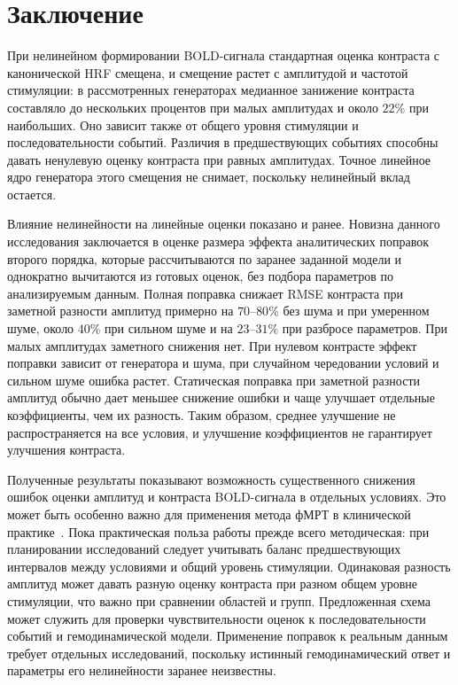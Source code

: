 

\section*{Заключение}

При нелинейном формировании BOLD-сигнала стандартная оценка контраста с канонической HRF смещена, и смещение растет с амплитудой и частотой стимуляции: в рассмотренных генераторах медианное занижение контраста составляло до нескольких процентов при малых амплитудах и около $22\%$ при наибольших. Оно зависит также от общего уровня стимуляции и последовательности событий. Различия в предшествующих событиях способны давать ненулевую оценку контраста при равных амплитудах. Точное линейное ядро генератора этого смещения не снимает, поскольку нелинейный вклад остается.

Влияние нелинейности на линейные оценки показано и ранее. Новизна данного исследования заключается в оценке размера эффекта аналитических поправок второго порядка, которые рассчитываются по заранее заданной модели и однократно вычитаются из готовых оценок, без подбора параметров по анализируемым данным. Полная поправка снижает RMSE контраста при заметной разности амплитуд примерно на $70$--$80\%$ без шума и при умеренном шуме, около $40\%$ при сильном шуме и на $23$--$31\%$ при разбросе параметров. При малых амплитудах заметного снижения нет. При нулевом контрасте эффект поправки зависит от генератора и шума, при случайном чередовании условий и сильном шуме ошибка растет. Статическая поправка при заметной разности амплитуд обычно дает меньшее снижение ошибки и чаще улучшает отдельные коэффициенты, чем их разность. Таким образом, среднее улучшение не распространяется на все условия, и улучшение коэффициентов не гарантирует улучшения контраста.

Полученные результаты показывают возможность существенного снижения ошибок оценки амплитуд и контраста BOLD-сигнала в отдельных условиях. Это может быть особенно важно для применения метода фМРТ в клинической практике~\cite{medvedev2012,kireev2013,myznikov2026}.
Пока практическая польза работы прежде всего методическая: при планировании исследований следует учитывать баланс предшествующих интервалов между условиями и общий уровень стимуляции. Одинаковая разность амплитуд может давать разную оценку контраста при разном общем уровне стимуляции, что важно при сравнении областей и групп. Предложенная схема может служить для проверки чувствительности оценок к последовательности событий и гемодинамической модели. Применение поправок к реальным данным требует отдельных исследований, поскольку истинный гемодинамический ответ и параметры его нелинейности заранее неизвестны.
